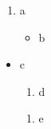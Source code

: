 \documentclass{article}
\begin{document}
\begin{enumerate}\item a \begin{itemize}\item b\end{itemize}\end{enumerate}
\begin{itemize}\item c \begin{enumerate}\item d\end{enumerate} \begin{enumerate}\item e\end{enumerate}\end{itemize}
\end{document}

